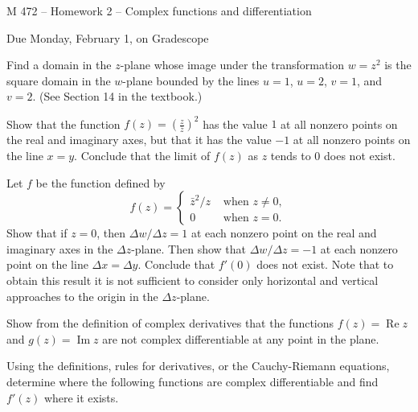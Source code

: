 \documentclass[11pt]{exam}
\newcommand{\ds}{\displaystyle}
\DeclareMathOperator{\re}{Re}
\DeclareMathOperator{\im}{Im}
\begin{document}
\centerline{\Large M 472 -- Homework 2 -- Complex functions and differentiation}
\vspace{2ex}
\centerline{Due Monday, February 1, on Gradescope}
\vspace{3ex}
\thispagestyle{empty}
\begin{questions}
\question Find a domain in the $z$-plane whose image under the
transformation $w=z^2$ is the square domain in the $w$-plane
bounded by the lines $u=1$, $u=2$, $v=1$, and $v=2$. (See
Section 14 in the textbook.)

\question Show that the function $\ds f(z) = \left( \frac{z}
{\bar{z}} \right)^2$ has the value $1$ at all nonzero points on
the real and imaginary axes, but that it has the value $-1$
at all nonzero points on the line $x=y$. Conclude that the
limit of $f(z)$ as $z$ tends to $0$ does not exist.

\question Let $f$ be the function defined by
\[
f(z) = 
\begin{cases}
  \bar{z}^2/z & \text{ when } z \ne 0, \\
  0 & \text{ when } z=0.
\end{cases}
\]
Show that if $z=0$, then $\Delta w / \Delta z = 1$ at each
nonzero point on the real and imaginary axes in the
$\Delta z$-plane. Then show that $\Delta w/ \Delta z = -1$ at
each nonzero point on the line $\Delta x = \Delta y$.
Conclude that $f'(0)$ does not exist. Note that to obtain this
result it is not sufficient to consider only horizontal and
vertical approaches to the origin in the $\Delta z$-plane.

\question Show from the definition of complex derivatives that
the functions $f(z) = \re z$ and $g(z) = \im z$ are not
complex differentiable at any point in the plane.

\question Using the definitions, rules for derivatives, or the
Cauchy-Riemann equations, determine where
the following functions are complex differentiable and find
$f'(z)$ where it exists.
\end{questions}
\end{document}
